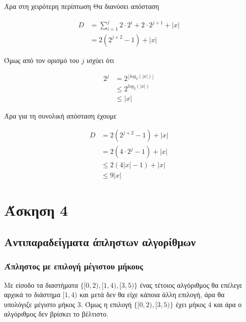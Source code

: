 Άρα στη χειρότερη περίπτωση Θα διανύσει απόσταση

\begin{equation} \label{eq1}
\begin{split}
  D & = \sum_{i = 1}^{j}2 \cdot 2^{i} + 2 \cdot 2^{j + 1}  + |x|  \\
    & = 2 (2^{j + 2} - 1) + |x|
\end{split}
\end{equation}

Όμως από τον ορισμό του $j$ ισχύει ότι

\begin{equation} \label{eq1}
\begin{split}
  2^{j} & = 2^{\lfloor log_{2}(|x|) \rfloor} \\
        & \leq 2^{log_{2}(|x|)} \\
        & \leq |x|
\end{split}
\end{equation}

Άρα για τη συνολική απόσταση έχουμε

\begin{equation} \label{eq1}
\begin{split}
  D & = 2 (2^{j + 2} - 1) + |x| \\
    & = 2 (4 \cdot 2^{j} - 1) + |x| \\
    & \leq 2 (4 |x| - 1) + |x| \\
    & \leq 9 |x|
\end{split}
\end{equation}

\section{Άσκηση 4}

\subsection{Αντιπαραδείγματα άπληστων αλγορίθμων}

\subsubsection{Άπληστος με επιλογή μέγιστου μήκους}

Με είσοδο τα διαστήματα $\{[0, 2), [1, 4), [3, 5)\}$ ένας τέτοιος αλγόριθμος θα
επέλεγε αρχικά το διάστημα $[1, 4)$ και μετά δεν θα είχε κάποια άλλη επιλογή,
άρα θα υπολόγιζε μέγιστο μήκος $3$. Όμως η επιλογή $\{[0, 2), [3, 5)\}$ έχει
μήκος $4$ και άρα ο αλγόριθμος δεν βρίσκει το βέλτιστο.

